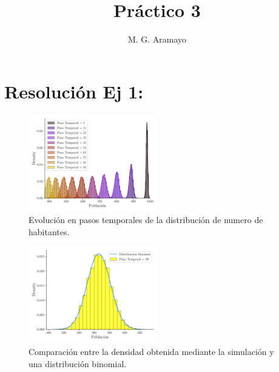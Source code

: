 \documentclass[twocolumn,aps,prl]{revtex4-1}
\begin{document}

\title{Práctico 3}
\author{M. G. Aramayo}


\maketitle



\section{Resolución Ej 1:}

\begin{figure}[!ht]
    \centering  
    \includegraphics[width=0.5\textwidth]{figuras/ex01-evolucion_temporal.pdf}
    \caption{Evolución en pasos temporales de la distribución de numero de habitantes.}
    \label{fig:ex01-evolucion_temporal} 
\end{figure}

\begin{figure}[!ht]  
    \centering  
    \includegraphics[width=0.5\textwidth]{figuras/ex01-ultima_iteracion.pdf}
    \caption{Comparación entre la densidad obtenida mediante la   simulación y una distribución binomial.}
    \label{fig:ex01-ultima_iteracion}
\end{figure}
\end{document}
